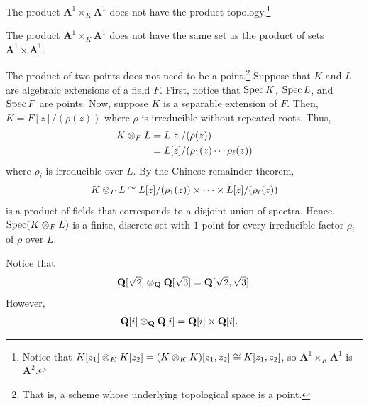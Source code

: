 \documentclass [11 pt, oneside] {article}
\begin{document}
\begin{remark}
	The product $\mathbf{A}^1\times_K \mathbf{A}^1$ does not have the product topology.\footnote{Notice that $K[z_1]\otimes_K K[z_2] = (K\otimes_KK) [ z_1,z_2] \cong K[z_1,z_2]$, so $\mathbf{A}^1\times_K \mathbf{A}^1$ is $\mathbf{A}^2$.}
\end{remark}

\begin{remark}
	The product $\mathbf{A}^1\times_K\mathbf{A}^1$ does not have the same set as the product of sets $\mathbf{A}^1\times \mathbf{A}^1$.
\end{remark}

\begin{remark}
	The product of two points does not need to be a point.\footnote{That is, a scheme whose underlying topological space is a point.} Suppose that $K$ and $L$ are algebraic extensions of a field $F$. First, notice that $\operatorname{Spec} K$, $\operatorname{Spec} L$, and $\operatorname{Spec} F$ are points. Now, suppose $K$ is a separable extension of $F$. Then, $K = F[z]/(\rho(z))$ where $\rho$ is irreducible without repeated roots. Thus,
	\begin{align*}
		K\otimes_F L &= L[z]/(\rho(z)) \\
			     &= L[z]/(\rho_1(z)\cdots\rho_\ell (z))
	\end{align*}
	where $\rho_i$ is irreducible over $L$. By the Chinese remainder theorem,
	\begin{align*}
		K\otimes_F L \cong L[z] /(\rho_1(z)) \times \cdots\times L[z]/(\rho_\ell(z))
	\end{align*}
	is a product of fields that corresponds to a disjoint union of spectra. Hence, $\operatorname{Spec}(K\otimes_F L)$ is a finite, discrete set with $1$ point for every irreducible factor $\rho_i$ of $\rho$ over $L$.
\end{remark}

\begin{example}[ ]\label{}\text{}
Notice that
\begin{align*}
	\mathbf{Q}[\sqrt{2} ] \otimes_\mathbf{Q} \mathbf{Q}[\sqrt{3} ] = \mathbf{Q}[\sqrt{2} ,\sqrt{3} ].
\end{align*}
However,
\begin{align*}
	\mathbf{Q}[i] \otimes_\mathbf{Q} \mathbf{Q}[i] &= \mathbf{Q}[i] \times \mathbf{Q}[i].
\end{align*}
\end{example}
\end{document}

